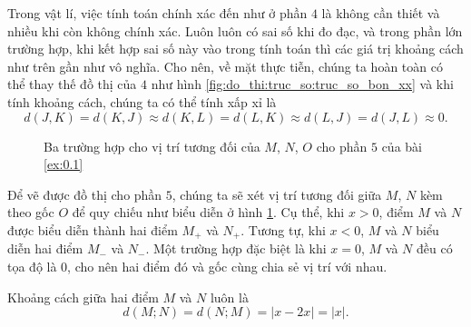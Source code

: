 Trong vật lí, việc tính toán chính xác đến như ở phần $4$ là không cần thiết và nhiều khi còn không chính xác. Luôn luôn có sai số khi đo đạc, và trong phần lớn trường hợp, khi kết hợp sai số này vào trong tính toán thì các giá trị khoảng cách như trên gần như vô nghĩa. Cho nên, về mặt thực tiễn, chúng ta hoàn toàn có thể thay thế đồ thị của $4$ như hình \ref{fig:do_thi:truc_so:truc_so_bon_xx} và khi tính khoảng cách, chúng ta có thể tính xấp xỉ là $$d(J,K) = d(K,J) \approx d(K,L) = d(L,K) \approx d(L,J) = d(J,L) \boxed{\approx 0}.$$

\begin{figure}[h]
   \centering
   \caption{Ba trường hợp cho vị trí tương đối của $M$, $N$, $O$ cho phần $5$ của bài \ref{ex:0.1}}
   \label{fig:truc phan 5}
\end{figure}

Để vẽ được đồ thị cho phần $5$, chúng ta sẽ xét vị trí tương đối giữa $M$, $N$ kèm theo gốc $O$ để quy chiếu như biểu diễn ở hình \ref{fig:truc phan 5}. Cụ thể, khi $x>0$, điểm $M$ và $N$ được biểu diễn thành hai điểm $M_+$ và $N_+$. Tương tự, khi $x<0$, $M$ và $N$ biểu diễn hai điểm $M_-$ và $N_-$. Một trường hợp đặc biệt là khi $x=0$, $M$ và $N$ đều có tọa độ là $0$, cho nên hai điểm đó và gốc cùng chia sẻ vị trí với nhau.

Khoảng cách giữa hai điểm $M$ và $N$ luôn là $$d(M;N)=d(N;M)=|x-2x|=\boxed{|x|}.$$